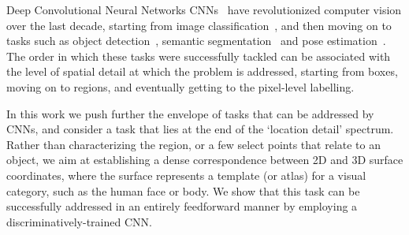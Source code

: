 Deep Convolutional Neural Networks CNNs~\cite{lecun1998gradient}
have revolutionized computer vision over the last decade, starting from  image classification~\cite{krizhevsky2012imagenet, simonyan2014very, szegedy2015going,he2016deep}, and then moving on to tasks such as object detection~\cite{girshick2014rich}, semantic segmentation~\cite{long2015fully,chen2016deeplab} and pose estimation~\cite{chen2014articulated, tompson2014joint,yang2016end,newell2016stacked}.
The order in which these tasks were successfully tackled can  be associated with the level of spatial detail at which the problem is addressed, starting from boxes, moving on to regions, and eventually getting to the  pixel-level labelling.

In this work we push further the envelope of tasks that can be addressed by CNNs, and consider a task that lies at the end of the `location detail' spectrum.
    Rather than characterizing  the region, or a few select points  that relate to an object, we aim at establishing a dense correspondence between 2D  and 3D surface coordinates, where the surface represents a template (or atlas) for a visual category, such as the human face or body. 
We show that  this task can be successfully addressed in an entirely feedforward manner by employing a discriminatively-trained CNN. 


